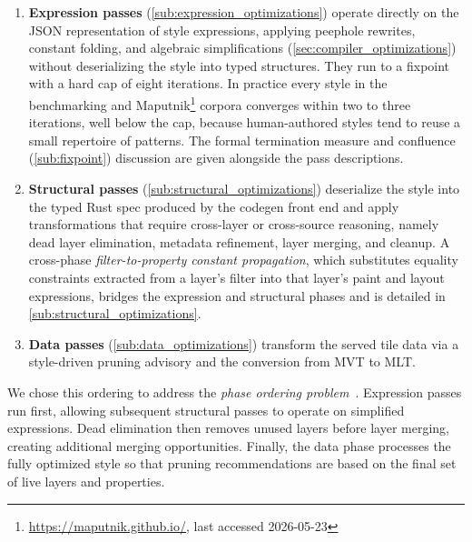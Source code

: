 \begin{enumerate}
    \item \textbf{Expression passes} (\cref{sub:expression_optimizations}) operate directly on the \ac{JSON} representation of style expressions, applying peephole rewrites, constant folding, and algebraic simplifications (\cref{sec:compiler_optimizations}) without deserializing the style into typed structures.
    They run to a fixpoint with a hard cap of eight iterations.
    In practice every style in the benchmarking and Maputnik\footnote{\url{https://maputnik.github.io/}, last accessed 2026-05-23} corpora converges within two to three iterations, well below the cap, because human-authored styles tend to reuse a small repertoire of patterns.
    The formal termination measure and confluence (\cref{sub:fixpoint}) discussion are given alongside the pass descriptions.
    \item \textbf{Structural passes} (\cref{sub:structural_optimizations}) deserialize the style into the typed Rust spec produced by the codegen front end and apply transformations that require cross-layer or cross-source reasoning, namely dead layer elimination, metadata refinement, layer merging, and cleanup.
    A cross-phase \emph{filter-to-property constant propagation}, which substitutes equality constraints extracted from a layer's filter into that layer's paint and layout expressions, bridges the expression and structural phases and is detailed in \cref{sub:structural_optimizations}.
    \item \textbf{Data passes} (\cref{sub:data_optimizations}) transform the served tile data via a style-driven pruning advisory and the conversion from \ac{MVT} to \ac{MLT}.
\end{enumerate}

\noindent We chose this ordering to address the \emph{phase ordering problem}~\cite{clickCombiningAnalysesCombining1995}.
Expression passes run first, allowing subsequent structural passes to operate on simplified expressions.
Dead elimination then removes unused layers before layer merging, creating additional merging opportunities.
Finally, the data phase processes the fully optimized style so that pruning recommendations are based on the final set of live layers and properties.

